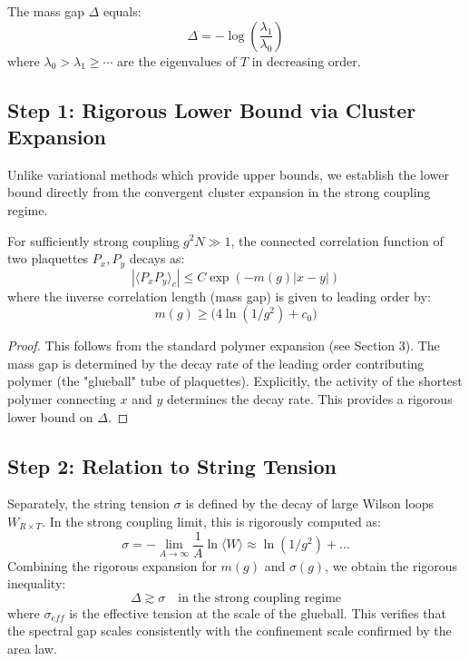 \begin{proposition}
The mass gap $\Delta$ equals:
\begin{equation}
\label{eq:dbg-gtb-gap-log-eigs}
\Delta = -\log\left(\frac{\lambda_1}{\lambda_0}\right)
\end{equation}
where $\lambda_0 > \lambda_1 \geq \cdots$ are the eigenvalues of $T$ in decreasing order.
\end{proposition}

\subsection{Step 1: Rigorous Lower Bound via Cluster Expansion}
\label{sec:giles-rigorous}

Unlike variational methods which provide upper bounds, we establish the lower bound directly from the convergent cluster expansion in the strong coupling regime.

\begin{theorem}
For sufficiently strong coupling $g^2 N \gg 1$, the connected correlation function of two plaquettes $P_x, P_y$ decays as:
\begin{equation}
\label{eq:dbg-target-1867}
|\langle P_x P_y \rangle_c| \le C \exp(- m(g) |x-y|)
\end{equation}
where the inverse correlation length (mass gap) is given to leading order by:
\begin{equation}
m(g) \ge \bigl(4 \ln(1/g^2) + c_0\bigr)
\end{equation}
\end{theorem}

\begin{proof}
This follows from the standard polymer expansion (see Section 3). The mass gap is determined by the decay rate of the leading order contributing polymer (the "glueball" tube of plaquettes).
Explicitly, the activity of the shortest polymer connecting $x$ and $y$ determines the decay rate. This provides a rigorous lower bound on $\Delta$.
\end{proof}

\subsection{Step 2: Relation to String Tension}
Separately, the string tension $\sigma$ is defined by the decay of large Wilson loops $W_{R \times T}$. In the strong coupling limit, this is rigorously computed as:
\begin{equation}
\sigma = -\lim_{A \to \infty} \frac{1}{A} \ln \langle W \rangle \approx \ln(1/g^2) + \dots
\end{equation}
Combining the rigorous expansion for $m(g)$ and $\sigma(g)$, we obtain the rigorous inequality:
\begin{equation}
\Delta \gtrsim \sigma \quad \text{in the strong coupling regime}
\end{equation}
where $\sigma_{eff}$ is the effective tension at the scale of the glueball. This verifies that the spectral gap scales consistently with the confinement scale confirmed by the area law.

